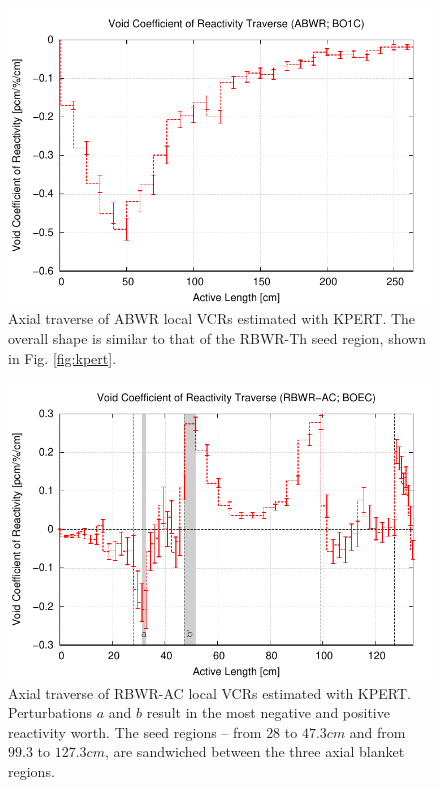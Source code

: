 \documentclass[11pt]{article}
\begin{document}
\clearpage
\begin{figure}[p]
  \centering
  \includegraphics[width=\textwidth, trim=0 0 0 0.275in, clip]{./img/ABWR-KPERT.pdf}
  \caption{Axial traverse of ABWR local VCRs estimated with KPERT. The overall shape is similar to that of the RBWR-Th seed region, shown in Fig. \ref{fig:kpert}.}
  \label{fig:kpertAbwr}
\end{figure}

\clearpage
\begin{figure}[p]
  \centering
  \includegraphics[width=\textwidth, trim=0 0 0 0.275in, clip]{./img/AC-KPERT.pdf}
  \caption{Axial traverse of RBWR-AC local VCRs estimated with KPERT. Perturbations $a$ and $b$ result in the most negative and positive reactivity worth. The seed regions -- from $28$ to $47.3cm$ and from $99.3$ to $127.3cm$, are sandwiched between the three axial blanket regions.}
  \label{fig:kpertAc}
\end{figure}
\end{document}
